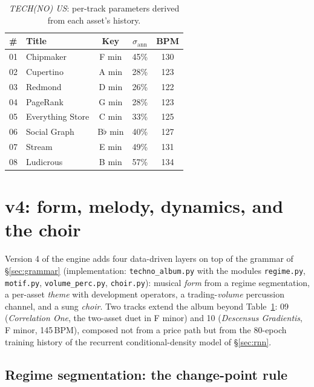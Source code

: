 \documentclass[11pt,a4paper]{article}
\begin{document}
\begin{table}[h]
\centering
\begin{tabular}{llccc}
\toprule
\# & Title & Key & $\sigma_{\mathrm{ann}}$ & BPM \\
\midrule
01 & Chipmaker & F min & 45\% & 130\\
02 & Cupertino & A min & 28\% & 123\\
03 & Redmond & D min & 26\% & 122\\
04 & PageRank & G min & 28\% & 123\\
05 & Everything Store & C min & 33\% & 125\\
06 & Social Graph & B$\flat$ min & 40\% & 127\\
07 & Stream & E min & 49\% & 131\\
08 & Ludicrous & B min & 57\% & 134\\
\bottomrule
\end{tabular}
\caption{\emph{TECH(NO) US}: per-track parameters derived from each asset's history.}
\label{tab:album}
\end{table}

\section{v4: form, melody, dynamics, and the choir}\label{sec:v4}

Version 4 of the engine adds four data-driven layers on top of the grammar
of \S\ref{sec:grammar} (implementation: \texttt{techno\_album.py} with the
modules \texttt{regime.py}, \texttt{motif.py}, \texttt{volume\_perc.py},
\texttt{choir.py}): musical \emph{form} from a regime segmentation, a
per-asset \emph{theme} with development operators, a trading-\emph{volume}
percussion channel, and a sung \emph{choir}. Two tracks extend the album
beyond Table~\ref{tab:album}: 09 (\emph{Correlation One}, the two-asset
duet in F minor) and 10 (\emph{Descensus Gradientis}, F minor, 145\,BPM),
composed not from a price path but from the 80-epoch training history of
the recurrent conditional-density model of \S\ref{sec:rnn}.

\subsection{Regime segmentation: the change-point rule}\label{sec:v4regime}
\end{document}
